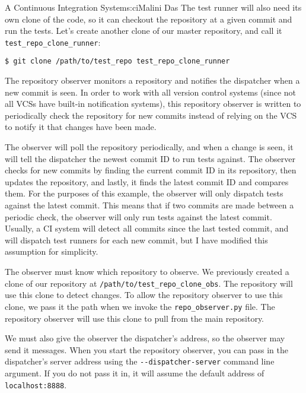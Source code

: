 \begin{aosachapter}{A Continuous Integration System}{s:ci}{Malini Das}
The test runner will also need its own clone of the code, so it can
checkout the repository at a given commit and run the tests. Let's
create another clone of our master repository, and call it
\texttt{test\_repo\_clone\_runner}:

\begin{verbatim}
$ git clone /path/to/test_repo test_repo_clone_runner
\end{verbatim}

\label{the-components}

\label{the-repository-observer-repoux5fobserver.py}

The repository observer monitors a repository and notifies the
dispatcher when a new commit is seen. In order to work with all version
control systems (since not all VCSs have built-in notification systems),
this repository observer is written to periodically check the repository
for new commits instead of relying on the VCS to notify it that changes
have been made.

The observer will poll the repository periodically, and when a change is
seen, it will tell the dispatcher the newest commit ID to run tests
against. The observer checks for new commits by finding the current
commit ID in its repository, then updates the repository, and lastly, it
finds the latest commit ID and compares them. For the purposes of this
example, the observer will only dispatch tests against the latest
commit. This means that if two commits are made between a periodic
check, the observer will only run tests against the latest commit.
Usually, a CI system will detect all commits since the last tested
commit, and will dispatch test runners for each new commit, but I have
modified this assumption for simplicity.

The observer must know which repository to observe. We previously
created a clone of our repository at
\texttt{/path/to/test\_repo\_clone\_obs}. The repository will use this
clone to detect changes. To allow the repository observer to use this
clone, we pass it the path when we invoke the \texttt{repo\_observer.py}
file. The repository observer will use this clone to pull from the main
repository.

We must also give the observer the dispatcher's address, so the observer
may send it messages. When you start the repository observer, you can
pass in the dispatcher's server address using the
\texttt{-{}-dispatcher-server} command line argument. If you do not pass
it in, it will assume the default address of \texttt{localhost:8888}.


\end{aosachapter}
